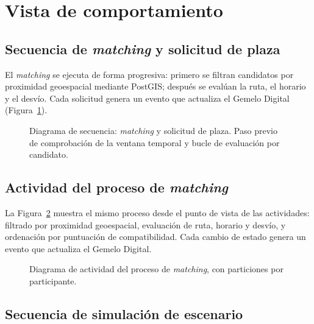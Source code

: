 \section{Vista de comportamiento}
\label{sec:anx-vista-comportamiento}

\subsection{Secuencia de \textit{matching} y solicitud de plaza}
\label{sec:anx-secuencia-matching}

El \textit{matching} se ejecuta de forma progresiva: primero se filtran candidatos por proximidad geoespacial mediante PostGIS; después se evalúan la ruta, el horario y el desvío. Cada solicitud genera un evento que actualiza el Gemelo Digital (Figura~\ref{fig:secuencia-matching}).

\begin{figure}[H]
  \centering
  
  \caption[Diagrama de secuencia: \textit{matching} y solicitud de plaza]{Diagrama de secuencia: \textit{matching} y solicitud de plaza. Paso previo de comprobación de la ventana temporal y bucle de evaluación por candidato.}
  \label{fig:secuencia-matching}
\end{figure}

\subsection{Actividad del proceso de \textit{matching}}
\label{sec:anx-actividad-matching}

La Figura~\ref{fig:actividad-matching} muestra el mismo proceso desde el punto de vista de las actividades: filtrado por proximidad geoespacial, evaluación de ruta, horario y desvío, y ordenación por puntuación de compatibilidad. Cada cambio de estado genera un evento que actualiza el Gemelo Digital.

\begin{figure}[H]
  \centering
  
  \caption[Diagrama de actividad del proceso de \textit{matching}]{Diagrama de actividad del proceso de \textit{matching}, con particiones por participante.} \label{fig:actividad-matching}
\end{figure}

\subsection{Secuencia de simulación de escenario}
\label{sec:anx-secuencia-simulacion}

